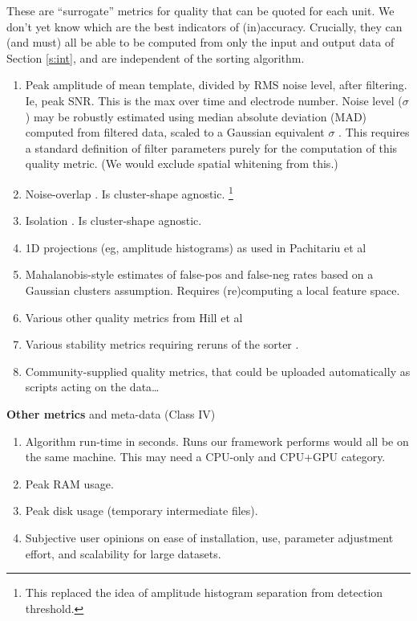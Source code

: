 \documentclass[10pt]{article}
\newcommand{\ben}{\begin{enumerate}}
\newcommand{\een}{\end{enumerate}}
\begin{document}
  These are ``surrogate'' metrics for quality that
  can be quoted for each unit. We don't yet know which are the best indicators of
  (in)accuracy.
  Crucially, they
  can (and must) all be able to be
  computed from only the input and output data of Section \eqref{s:int},
  and are independent of the sorting algorithm.
  \ben
\item Peak amplitude of mean template, divided by RMS noise level,
  after filtering.
  Ie, peak SNR. This is the max over time and electrode number.
  Noise level ($\sigma$)
  may be robustly estimated using median absolute deviation (MAD) computed
  from filtered data,
  scaled to a Gaussian equivalent $\sigma$ \cite[(3.1)]{spc}.
  This requires a standard definition of filter parameters purely for the
  computation of this quality metric.
  (We would exclude spatial whitening from this.)
\item Noise-overlap \cite{mountainsort}. Is cluster-shape agnostic.
  \footnote{This replaced the idea of amplitude histogram separation from detection threshold.}
\item Isolation \cite{mountainsort}. Is cluster-shape agnostic.
\item 1D projections (eg, amplitude histograms) as used in Pachitariu et al \cite{kilosort}
\item Mahalanobis-style estimates of false-pos and false-neg rates
  based on a Gaussian clusters assumption. Requires (re)computing a local
  feature space.
  \item Various other quality metrics from Hill et al \cite{Hill2011}
  \item Various stability metrics requiring reruns of the sorter \cite{validspike}.
\item Community-supplied quality metrics, that could be uploaded automatically as scripts acting on the data\ldots
  \een

\item {\bf Other metrics} and meta-data (Class IV)
  \ben
\item Algorithm run-time in seconds. Runs our framework performs would
  all be on the same machine.
  This may need a CPU-only and CPU+GPU category.
\item Peak RAM usage.
\item Peak disk usage (temporary intermediate files).
\item Subjective user opinions on ease of installation, use, parameter adjustment effort, and scalability for large datasets.
  \een
  
\end{document}
